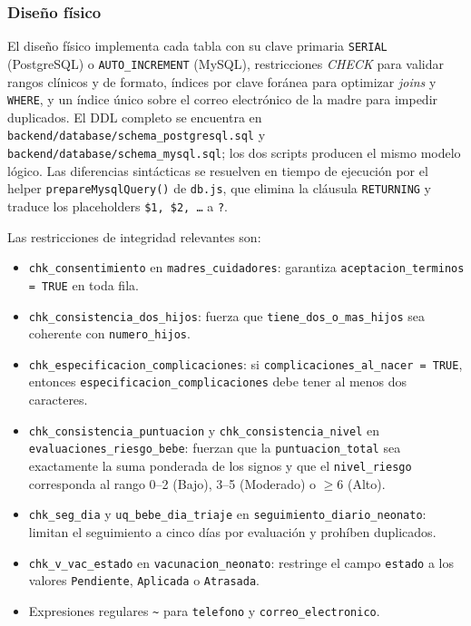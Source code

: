 \documentclass[12pt,letterpaper]{article}
\begin{document}
\subsubsection{Diseño físico}

El diseño físico implementa cada tabla con su clave primaria \texttt{SERIAL} (PostgreSQL) o \texttt{AUTO\_INCREMENT} (MySQL), restricciones \textit{CHECK} para validar rangos clínicos y de formato, índices por clave foránea para optimizar \textit{joins} y \texttt{WHERE}, y un índice único sobre el correo electrónico de la madre para impedir duplicados. El DDL completo se encuentra en \texttt{backend/database/schema\_postgresql.sql} y \texttt{backend/database/schema\_mysql.sql}; los dos scripts producen el mismo modelo lógico. Las diferencias sintácticas se resuelven en tiempo de ejecución por el helper \texttt{prepareMysqlQuery()} de \texttt{db.js}, que elimina la cláusula \texttt{RETURNING} y traduce los placeholders \texttt{\$1, \$2, \ldots} a \texttt{?}.

Las restricciones de integridad relevantes son:

\begin{itemize}
    \item \texttt{chk\_consentimiento} en \texttt{madres\_cuidadores}: garantiza \texttt{aceptacion\_terminos = TRUE} en toda fila.
    \item \texttt{chk\_consistencia\_dos\_hijos}: fuerza que \texttt{tiene\_dos\_o\_mas\_hijos} sea coherente con \texttt{numero\_hijos}.
    \item \texttt{chk\_especificacion\_complicaciones}: si \texttt{complicaciones\_al\_nacer = TRUE}, entonces \texttt{especificacion\_complicaciones} debe tener al menos dos caracteres.
    \item \texttt{chk\_consistencia\_puntuacion} y \texttt{chk\_consistencia\_nivel} en \texttt{evaluaciones\_riesgo\_bebe}: fuerzan que la \texttt{puntuacion\_total} sea exactamente la suma ponderada de los signos y que el \texttt{nivel\_riesgo} corresponda al rango 0--2 (Bajo), 3--5 (Moderado) o $\geq$6 (Alto).
    \item \texttt{chk\_seg\_dia} y \texttt{uq\_bebe\_dia\_triaje} en \texttt{seguimiento\_diario\_neonato}: limitan el seguimiento a cinco días por evaluación y prohíben duplicados.
    \item \texttt{chk\_v\_vac\_estado} en \texttt{vacunacion\_neonato}: restringe el campo \texttt{estado} a los valores \texttt{Pendiente}, \texttt{Aplicada} o \texttt{Atrasada}.
    \item Expresiones regulares \texttt{\textasciitilde} para \texttt{telefono} y \texttt{correo\_electronico}.
\end{itemize}
\end{document}
